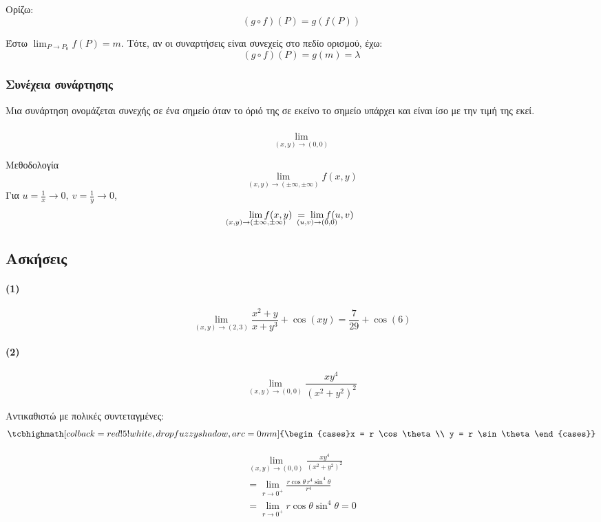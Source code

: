 \documentclass[11pt,a4paper,titlepage]{article}
\newcommand{\attnboxed}[1]{\tcbhighmath[colback=red!5!white,drop fuzzy shadow,arc=0mm]{#1}}
\begin{document}
Ορίζω:
\[
\left( g \circ f \right)(P) = g \left( f(P) \right)
\]

Έστω \( \lim _{P \to P_0} f(P) =m\). Τότε, αν οι συναρτήσεις είναι συνεχείς στο πεδίο ορισμού, έχω:
\[
\left( g \circ f \right)(P) = g(m) = \lambda
\]

\subsubsection{Συνέχεια συνάρτησης}
Μια συνάρτηση ονομάζεται συνεχής σε ένα σημείο όταν το όριό της σε εκείνο το σημείο υπάρχει και είναι ίσο με την τιμή της εκεί.

\subsubsection{}
\[\lim_{(x,y)\to(0,0)}
\]

\begin{infobox}{Μεθοδολογία}
\[ \lim_{(x,y) \to ( \pm \infty, \pm \infty )} f(x,y) \]
\tcblower
Για \(u=\frac{1}{x} \to 0, \ v=\frac{1}{y} \to 0\),
\[
\lim_{\mathclap{(x,y) \to ( \pm \infty, \pm \infty )}} f(x,y) \; = \;
\lim_{\mathclap{(u,v) \to ( 0,0 )}} f(u,v)
\]
\end{infobox}

\subsection{Ασκήσεις}
\paragraph{(1)}
\[
\lim_{(x,y) \to (2,3)} \frac{x^2+y}{x+y^3} + \cos (xy) = \frac{7}{29} + \cos(6)
\]
\paragraph{(2)}
\[
\lim_{(x,y) \to (0,0)} \frac{xy^4}{(x^2+y^2)^2}
\]

Αντικαθιστώ με πολικές συντεταγμένες:
\[
\attnboxed{\begin{cases}x = r \cos \theta \\ y = r \sin \theta\end{cases}}
\]

\begin{align*}
\lim_{(x,y) \to (0,0)} \frac{xy^4}{(x^2+y^2)^2} \\
= \lim_{r \to 0^+} \frac{r \cos \theta \, r^4 \sin^4 \theta}{r^4} \\
= \lim_{r \to 0^+} r \cos \theta \sin^4 \theta = 0
\end{align*}
\end{document}

